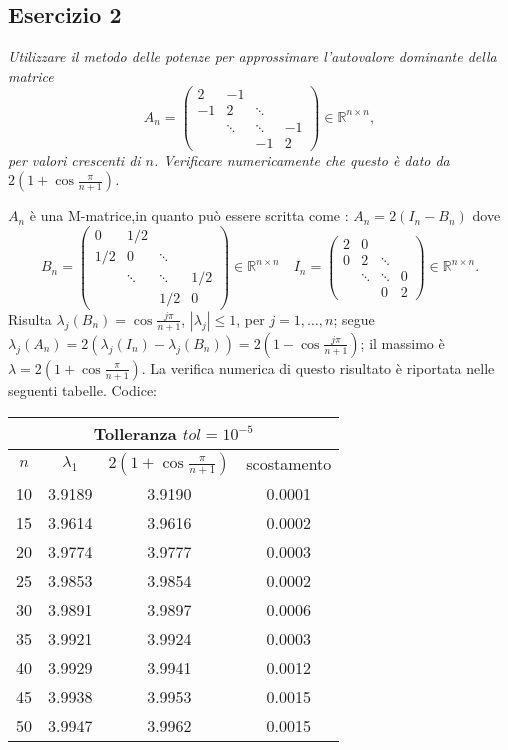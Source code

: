 \subsection{Esercizio 2}
\label{sub:Es2}
\emph{
      Utilizzare il metodo delle potenze per approssimare l'autovalore dominante della matrice
			\[
				A_n=\begin{pmatrix}
					2 & -1 & &\\
					-1 & 2 & \ddots &\\
					& \ddots & \ddots & -1\\
					& & -1 & 2
				\end{pmatrix}\in\mathbb{R}^{n\times n},
			\]
			per valori crescenti di $n$. Verificare numericamente che questo è dato da $2\left(1+\cos\frac{\pi}{n+1}\right)$.
}
\begin{sol}
  \normalfont
  $A_n$ è una M-matrice,in quanto può essere scritta come : $A_n=2(I_n-B_n)$ dove
  $$B_n=\begin{pmatrix}0&1/2&&\\1/2&0&\ddots&\\&\ddots&\ddots&1/2\\&&1/2&0\end{pmatrix}\in\mathbb{R}^{n\times n} \quad I_n=\begin{pmatrix}2&0&&\\0&2&\ddots&\\&\ddots&\ddots&0\\&&0&2\end{pmatrix}\in\mathbb{R}^{n\times n}.$$
  Risulta $\lambda_j(B_n)=\cos{\frac{j\pi}{n+1}}$, $|\lambda_j|\leq 1$, per $j=1,\ldots,n$;
  segue $\lambda_j(A_n)=2(\lambda_j(I_n)-\lambda_j(B_n))=2(1-\cos{\frac{j\pi}{n+1}})$; il massimo è $\lambda=2(1+\cos{\frac{\pi}{n+1}})$.
  La verifica numerica di questo risultato è riportata nelle seguenti tabelle.
  Codice:\\
  
  \vspace{0.5em}
  \begin{center}\begin{tabular}{c|c|c|c}
    \hline\multicolumn{4}{c}{Tolleranza $tol=10^{-5}$}\\\hline
    $n$ & $\lambda_1$ & $2\left(1+\cos{\frac{\pi}{n+1}}\right)$ & scostamento\\\hline
    10 & 3.9189 & 3.9190 & 0.0001 \\
    15 & 3.9614 & 3.9616 & 0.0002 \\
    20 & 3.9774 & 3.9777 & 0.0003 \\
    25 & 3.9853 & 3.9854 & 0.0002 \\
    30 & 3.9891 & 3.9897 & 0.0006 \\
    35 & 3.9921 & 3.9924 & 0.0003 \\
    40 & 3.9929 & 3.9941 & 0.0012 \\
    45 & 3.9938 & 3.9953 & 0.0015 \\
    50 & 3.9947 & 3.9962 & 0.0015
  \end{tabular}\end{center}


\end{sol}
